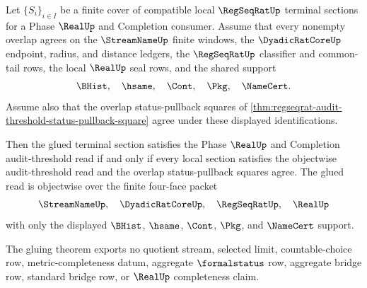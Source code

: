 \begin{theorem}
\label{thm:regseqrat-audit-threshold-finite-cover-gluing}
Let $\{S_i\}_{i \in I}$ be a finite cover of compatible local $\RegSeqRatUp$ terminal sections for a Phase $\RealUp$ and Completion consumer. Assume that every nonempty overlap agrees on the $\StreamNameUp$ finite windows, the $\DyadicRatCoreUp$ endpoint, radius, and distance ledgers, the $\RegSeqRatUp$ classifier and common-tail rows, the local $\RealUp$ seal rows, and the shared support
$$
\BHist,\quad \hsame,\quad \Cont,\quad \Pkg,\quad \NameCert.
$$
Assume also that the overlap status-pullback squares of \autoref{thm:regseqrat-audit-threshold-status-pullback-square} agree under these displayed identifications.

Then the glued terminal section satisfies the Phase $\RealUp$ and Completion audit-threshold read if and only if every local section satisfies the objectwise audit-threshold read and the overlap status-pullback squares agree. The glued read is objectwise over the finite four-face packet
$$
\StreamNameUp,\quad \DyadicRatCoreUp,\quad \RegSeqRatUp,\quad \RealUp
$$
with only the displayed $\BHist$, $\hsame$, $\Cont$, $\Pkg$, and $\NameCert$ support.

The gluing theorem exports no quotient stream, selected limit, countable-choice row, metric-completeness datum, aggregate $\formalstatus$ row, aggregate bridge row, standard bridge row, or $\RealUp$ completeness claim.
\end{theorem}
